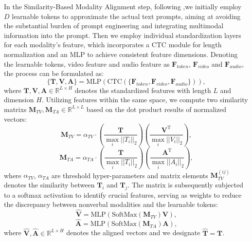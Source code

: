 \documentclass[letterpaper]{article}
\begin{document}
In the Similarity-Based Modality Alignment step, following \cite{zhou2022conditional,rao2022denseclip,10.1145/1143844.1143891},we initially employ $D$ learnable tokens to approximate the actual text prompts, aiming at avoiding the substantial burden of prompt engineering and integrating multimodal information into the prompt. Then we employ individual standardization layers for each modality's feature, which incorporates a CTC \cite{10.1145/1143844.1143891} module for length normalization and an MLP to achieve consistent feature dimensions. Denoting the learnable tokens, video feature and audio feature as $\textbf{F}_{token}$, $\textbf{F}_{video}$ and $\textbf{F}_{audio}$, the process can be formulated as:
\begin{equation}
\{\textbf{T}, \textbf{V}, \textbf{A}\} = \text{MLP}(\text{CTC}(\{\textbf{F}_{token}, \textbf{F}_{video}, \textbf{F}_{audio}\})),
\end{equation}
where $\textbf{T}, \textbf{V}, \textbf{A} \in \mathbb{R}^{L \times H}$ denotes the standardized features with length $L$ and dimension $H$. Utilizing features within the same space, we compute two similarity matrixs $\textbf{M}_{TV}, \textbf{M}_{TA} \in \mathbb{R}^{L \times L}$ based on the dot product results of normalized vectors:
\begin{equation}
\textbf{M}_{TV} = \alpha_{TV} \cdot (\frac{\textbf{T}}{\max \limits_{i} ||T_{i}||_{2}}) (\frac{\textbf{V}^{\text{T}}}{\max \limits_{i} ||V_{i}||_{2}}),
\end{equation}
\begin{equation}
\textbf{M}_{TA} = \alpha_{TA} \cdot (\frac{\textbf{T}}{\max \limits_{i} ||T_{i}||_{2}}) (\frac{\textbf{A}^{\text{T}}}{\max \limits_{i} ||A_{i}||_{2}}),
\end{equation}
where $\alpha_{TV}$, $\alpha_{TA}$ are threshold hyper-parameters and matrix elements $\textbf{M}_{TV}^{(ij)}$ denotes the similarity between $\textbf{T}_{i}$ and $\textbf{T}_{j}$. The matrix is subsequently subjected to a softmax activation to identify crucial features, serving as weights to reduce the discrepancy between nonverbal modalities and the learnable tokens:
\begin{equation}
\hat{\textbf{V}} = \text{MLP}(\text{SoftMax}(\textbf{M}_{TV})\textbf{V}),
\end{equation}
\begin{equation}
\hat{\textbf{A}} = \text{MLP}(\text{SoftMax}(\textbf{M}_{TA})\textbf{A}),
\end{equation}
where $\hat{\textbf{V}}, \hat{\textbf{A}} \in \mathbb{R}^{L \times H}$ denotes the aligned vectors and we designate $\hat{\textbf{T}} = \textbf{T}$.
\end{document}

